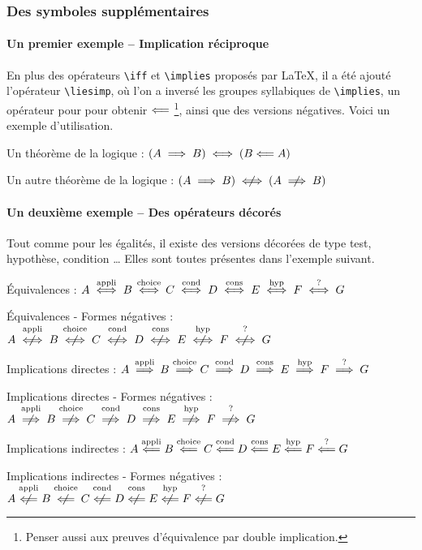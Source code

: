 \documentclass[12pt,a4paper]{article}
\theoremstyle{definition}
\begin{document}
\subsubsection{Des symboles supplémentaires}

\paragraph{Un premier exemple -- Implication réciproque}

En plus des opérateurs \verb+\iff+ et \verb+\implies+ proposés par \LaTeX{}, il a été ajouté l'opérateur \verb+\liesimp+, où l'on a inversé les groupes syllabiques de \verb+\implies+, un opérateur pour pour obtenir $\mathrel{\Longleftarrow}$
\footnote{
	Penser aussi aux preuves d'équivalence par double implication.
},
ainsi que des versions négatives. Voici un exemple d'utilisation.

\begin{tcblisting}{}
Un théorème de la logique : $(A \implies B) \iff (B \liesimp A)$

Un autre théorème de la logique : $(A \implies B) \notiff (A \notimplies B)$
\end{tcblisting}



\paragraph{Un deuxième exemple -- Des opérateurs décorés}

Tout comme pour les égalités, il existe des versions décorées de type test, hypothèse, condition \dots{} 
Elles sont toutes présentes dans l'exemple suivant.


\begin{tcblisting}{}
Équivalences :
$A \iffappli B \iffchoice C \iffcond D \iffcons E \iffhyp F \ifftest G$

Équivalences - Formes négatives :
$A \notiffappli B \notiffchoice C \notiffcond D
   \notiffcons E \notiffhyp F \notifftest G$

Implications directes :
$A \impliesappli B \implieschoice C \impliescond D
   \impliescons E \implieshyp F \impliestest G$

Implications directes - Formes négatives :
$A \notimpliesappli B \notimplieschoice C \notimpliescond D
   \notimpliescons E \notimplieshyp F \notimpliestest G$

Implications indirectes :
$A \liesimpappli B \liesimpchoice C \liesimpcond D
   \liesimpcons E \liesimphyp F \liesimptest G$

Implications indirectes - Formes négatives :
$A \notliesimpappli B \notliesimpchoice C \notliesimpcond D
   \notliesimpcons E \notliesimphyp F \notliesimptest G$
\end{tcblisting}
\end{document}
